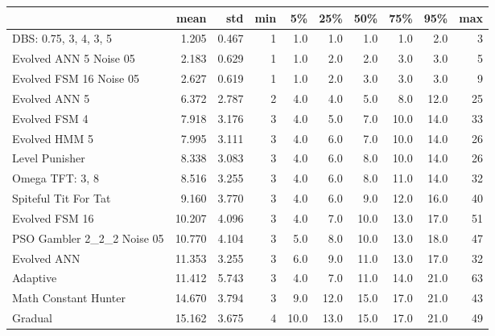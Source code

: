 \begin{tabular}{lrrrrrrrrr}
\toprule
{} &    mean &    std &  min &    5\% &   25\% &   50\% &   75\% &   95\% &  max \\
\midrule
DBS: 0.75, 3, 4, 3, 5      &   1.205 &  0.467 &    1 &   1.0 &   1.0 &   1.0 &   1.0 &   2.0 &    3 \\
Evolved ANN 5 Noise 05     &   2.183 &  0.629 &    1 &   1.0 &   2.0 &   2.0 &   3.0 &   3.0 &    5 \\
Evolved FSM 16 Noise 05    &   2.627 &  0.619 &    1 &   1.0 &   2.0 &   3.0 &   3.0 &   3.0 &    9 \\
Evolved ANN 5              &   6.372 &  2.787 &    2 &   4.0 &   4.0 &   5.0 &   8.0 &  12.0 &   25 \\
Evolved FSM 4              &   7.918 &  3.176 &    3 &   4.0 &   5.0 &   7.0 &  10.0 &  14.0 &   33 \\
Evolved HMM 5              &   7.995 &  3.111 &    3 &   4.0 &   6.0 &   7.0 &  10.0 &  14.0 &   26 \\
Level Punisher             &   8.338 &  3.083 &    3 &   4.0 &   6.0 &   8.0 &  10.0 &  14.0 &   26 \\
Omega TFT: 3, 8            &   8.516 &  3.255 &    3 &   4.0 &   6.0 &   8.0 &  11.0 &  14.0 &   32 \\
Spiteful Tit For Tat       &   9.160 &  3.770 &    3 &   4.0 &   6.0 &   9.0 &  12.0 &  16.0 &   40 \\
Evolved FSM 16             &  10.207 &  4.096 &    3 &   4.0 &   7.0 &  10.0 &  13.0 &  17.0 &   51 \\
PSO Gambler 2\_2\_2 Noise 05 &  10.770 &  4.104 &    3 &   5.0 &   8.0 &  10.0 &  13.0 &  18.0 &   47 \\
Evolved ANN                &  11.353 &  3.255 &    3 &   6.0 &   9.0 &  11.0 &  13.0 &  17.0 &   32 \\
Adaptive                   &  11.412 &  5.743 &    3 &   4.0 &   7.0 &  11.0 &  14.0 &  21.0 &   63 \\
Math Constant Hunter       &  14.670 &  3.794 &    3 &   9.0 &  12.0 &  15.0 &  17.0 &  21.0 &   43 \\
Gradual                    &  15.162 &  3.675 &    4 &  10.0 &  13.0 &  15.0 &  17.0 &  21.0 &   49 \\
\bottomrule
\end{tabular}
